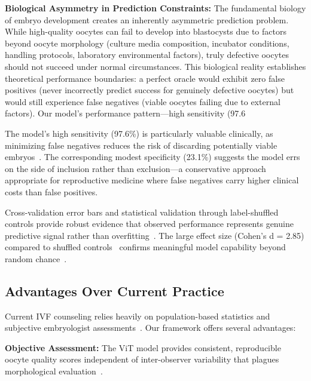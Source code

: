 \textbf{Biological Asymmetry in Prediction Constraints:} The fundamental biology of embryo development creates an inherently asymmetric prediction problem. While high-quality oocytes can fail to develop into blastocysts due to factors beyond oocyte morphology (culture media composition, incubator conditions, handling protocols, laboratory environmental factors), truly defective oocytes should not succeed under normal circumstances. This biological reality establishes theoretical performance boundaries: a perfect oracle would exhibit zero false positives (never incorrectly predict success for genuinely defective oocytes) but would still experience false negatives (viable oocytes failing due to external factors). Our model's performance pattern—high sensitivity (97.6%

The model's high sensitivity (97.6\%) is particularly valuable clinically, as minimizing false negatives reduces the risk of discarding potentially viable embryos~\cite{cutting2008elective}. The corresponding modest specificity (23.1\%) suggests the model errs on the side of inclusion rather than exclusion—a conservative approach appropriate for reproductive medicine where false negatives carry higher clinical costs than false positives.

Cross-validation error bars and statistical validation through label-shuffled controls provide robust evidence that observed performance represents genuine predictive signal rather than overfitting~\cite{hastie2009elements}. The large effect size (Cohen's d = 2.85) compared to shuffled controls~\cite{cohen1988statistical} confirms meaningful model capability beyond random chance~\cite{mann1947test}.

\subsection{Advantages Over Current Practice}

Current IVF counseling relies heavily on population-based statistics and subjective embryologist assessments~\cite{asrm2017embryo,racowsky2010standardization}. Our framework offers several advantages:

\textbf{Objective Assessment:} The ViT model provides consistent, reproducible oocyte quality scores independent of inter-observer variability that plagues morphological evaluation~\cite{paternot2009observer,paternot2011multicentre}.

